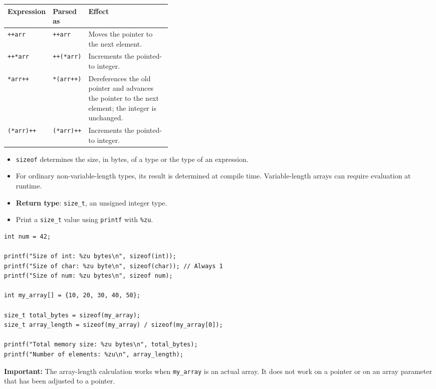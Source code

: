 \documentclass[11pt,a4paper]{article}
\begin{document}
\begin{longtable}{@{}
    p{0.18\linewidth}
    p{0.20\linewidth}
    p{}@{}}
\toprule
\textbf{Expression} & \textbf{Parsed as} & \textbf{Effect} \\
\midrule
\endhead
\bottomrule
\endlastfoot
\texttt{++arr}
    & \texttt{++arr}
    & Moves the pointer to the next element. \\
\texttt{++*arr}
    & \texttt{++(*arr)}
    & Increments the pointed-to integer. \\
\texttt{*arr++}
    & \texttt{*(arr++)}
    & Dereferences the old pointer and advances the pointer
      to the next element; the integer is unchanged. \\
\texttt{(*arr)++}
    & \texttt{(*arr)++}
    & Increments the pointed-to integer. \\
\end{longtable}


\begin{itemize}
    \item \texttt{sizeof} determines the size, in bytes, of a type
          or the type of an expression.
    \item For ordinary non-variable-length types, its result is
          determined at compile time. Variable-length arrays can
          require evaluation at runtime.
    \item \textbf{Return type}: \texttt{size\_t}, an unsigned
          integer type.
    \item Print a \texttt{size\_t} value using
          \texttt{printf} with \texttt{\%zu}.
\end{itemize}

\begin{lstlisting}[style=cscode]
int num = 42;

printf("Size of int: %zu bytes\n", sizeof(int));
printf("Size of char: %zu byte\n", sizeof(char)); // Always 1
printf("Size of num: %zu bytes\n", sizeof num);

int my_array[] = {10, 20, 30, 40, 50};

size_t total_bytes = sizeof(my_array);
size_t array_length = sizeof(my_array) / sizeof(my_array[0]);

printf("Total memory size: %zu bytes\n", total_bytes);
printf("Number of elements: %zu\n", array_length);
\end{lstlisting}

\textbf{Important:}
The array-length calculation works when \texttt{my\_array} is
an actual array. It does not work on a pointer or on an array
parameter that has been adjusted to a pointer.
\end{document}
